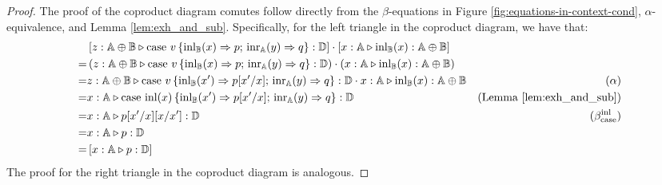 \documentclass[10pt,a4paper]{amsart}
\theoremstyle{definition}
\theoremstyle{definition}
\theoremstyle{definition}
\theoremstyle{definition}
\theoremstyle{definition}
\theoremstyle{definition}
\begin{document}
\begin{proof}
The proof of the coproduct diagram comutes follow directly from the $\beta$-equations in Figure \ref{fig:equations-in-context-cond}, $\alpha$-equivalence, and Lemma \ref{lem:exh_and_sub}. Specifically, for the left triangle in the coproduct diagram, we have that:
  \begin{align*}
    & \left[z:\mathbb{A} \oplus \mathbb{B}  \triangleright \text{case } v\,\{\mathrm{inl}_{\mathbb{B}}(x) \Rightarrow p ; \, \mathrm{inr}_{\mathbb{A}}(y) \Rightarrow q\}: \mathbb{D}\right] \cdot \left[ x: \mathbb{A}\triangleright \mathrm{inl}_{\mathbb{B}}(x): \mathbb{A} \oplus \mathbb{B} \right]  \\
    =& \left(z:\mathbb{A} \oplus \mathbb{B}  \triangleright \text{case } v\,\{\mathrm{inl}_{\mathbb{B}}(x) \Rightarrow p ; \, \mathrm{inr}_{\mathbb{A}}(y) \Rightarrow q\}: \mathbb{D}\right) \cdot \left( x: \mathbb{A}\triangleright \mathrm{inl}_{\mathbb{B}}(x): \mathbb{A} \oplus \mathbb{B} \right) 
   \\
    =& z:\mathbb{A} \oplus \mathbb{B}  \triangleright \text{case } v\,\{\mathrm{inl}_{\mathbb{B}}(x') \Rightarrow p[x'/ x] ; \, \mathrm{inr}_{\mathbb{A}}(y) \Rightarrow q\}: \mathbb{D} \cdot  x: \mathbb{A}\triangleright \mathrm{inl}_{\mathbb{B}}(x): \mathbb{A} \oplus \mathbb{B} & (\alpha)\\
    = & x:\mathbb{A} \triangleright \text{case } \mathrm{inl}(x) \,\{\mathrm{inl}_{\mathbb{B}}(x') \Rightarrow p[x'/ x] ; \, \mathrm{inr}_{\mathbb{A}}(y) \Rightarrow q\}: \mathbb{D} & (\text{Lemma } \ref{lem:exh_and_sub})  \\
    = &  x:\mathbb{A} \triangleright p[x'/x][x/x']: \mathbb{D} & (\beta_{\text{case}}^{\text{inl}}) \\
    = & x:\mathbb{A} \triangleright p: \mathbb{D} \\
    = &  \left[x:\mathbb{A} \triangleright p: \mathbb{D}\right]  \\
  \end{align*}
  The proof for the right triangle in the coproduct diagram is analogous.
 

\end{proof}
\end{document}
